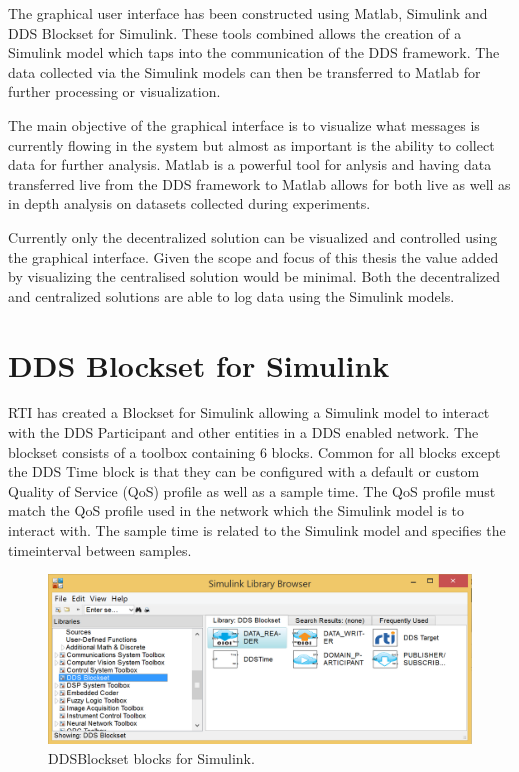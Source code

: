 The graphical user interface has been constructed using Matlab, Simulink and DDS Blockset for Simulink.
These tools combined allows the creation of a Simulink model which taps into the communication of the DDS framework.
The data collected via the Simulink models can then be transferred to Matlab for further processing or visualization.

The main objective of the graphical interface is to visualize what messages is currently flowing in the system but almost as important is the ability to collect data for further analysis.
Matlab is a powerful tool for anlysis and having data transferred live from the DDS framework to Matlab allows for both live as well as in depth analysis on datasets collected during experiments.

Currently only the decentralized solution can be visualized and controlled using the graphical interface. Given the scope and focus of this thesis the value added by visualizing the centralised solution would be minimal. Both the decentralized and centralized solutions are able to log data using the Simulink models.

\section{DDS Blockset for Simulink}
RTI has created a Blockset for Simulink allowing a Simulink model to interact with the DDS Participant and other entities in a DDS enabled network.
The blockset consists of a toolbox containing 6 blocks. Common for all blocks except the DDS Time block is that they can be configured with a default or custom Quality of Service (QoS) profile as well as a sample time. The QoS profile must match the QoS profile used in the network which the Simulink model is to interact with. The sample time is related to the Simulink model and specifies the timeinterval between samples.

\begin{figure}[h]
\includegraphics[width=\textwidth]{figures/DDSBlockset}
	\caption[DDSBlockset blocks for Simulink]{
		\label{fig:DDSBlocksetBlocks} 
		\footnotesize{%
			DDSBlockset blocks for Simulink.
		}
	}
\end{figure}


